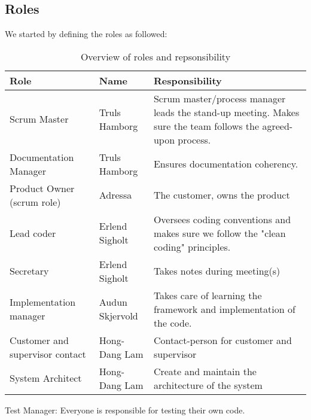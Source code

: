\subsection{Roles}
We started by defining the roles as followed:

\begin{table}[H]
  \begin{tabular}{|ll p{5cm}|}
    \hline
    Role & Name & Responsibility \\ \hline 
    Scrum Master & Truls Hamborg &  Scrum master/process manager leads the stand-up meeting. Makes sure the team follows the agreed-upon process. \\ \hline
    Documentation Manager & Truls Hamborg &  Ensures documentation coherency. \\ \hline
    Product Owner (scrum role) & Adressa & The customer, owns the product\\ \hline
    Lead coder & Erlend Sigholt & Oversees coding conventions and makes sure we follow the "clean coding" principles. \\ \hline
    Secretary & Erlend Sigholt & Takes notes during meeting(s) \\ \hline
    Implementation manager & Audun Skjervold & Takes care of learning the framework and implementation of the code.\\ \hline
    Customer and supervisor contact & Hong-Dang Lam & Contact-person for customer and supervisor \\ \hline
    System Architect & Hong-Dang Lam & Create and maintain the architecture of the system \\
    \hline
  \end{tabular}
  \caption{Overview of roles and repsonsibility}
  \end{table}
Test Manager: Everyone is responsible for testing their own code.